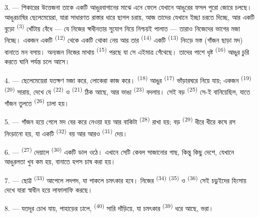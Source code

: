 3. --- শিকারের উত্তেজনা তাকে একটি আঙুরবাগানের মাঝে এনে ফেলে যেখানে আঙুরের ফসল
পুরো জোরে চলছে। আঙুরচাষির ছেলেমেয়েরা, যারা সাধারণত রাস্তার ধারে ছাগল চরায়,
আজ তাদের যেখানে ইচ্ছা চরতে দিচ্ছে, আর একটি বুড়ো 
\textsuperscript{(3)} খোঁটায় বেঁধে --- যে নিজের স্বাধীনতার সুযোগ নিয়ে নিশ্চয়ই
পালাত --- তারাও নিজেদের ভাগের মজা নিচ্ছে। একজন একটি 
\textsuperscript{(12)} থেকে একটি থোকা নেয় আর তার  \textsuperscript{(14)}
একটি  \textsuperscript{(13)} নিংড়ে মস্ত (গাঁজন ছাড়া মদ)
বানাতে মন বসায়। অন্যজন নিজের মাথায়  \textsuperscript{(15)}
পরছে যা সে এইমাত্র গেঁথেছে। তাদের পাশে ধৃষ্ট 
\textsuperscript{(16)} আঙুর চুরি করতে ঘানি পর্যন্ত চলে আসে।

4. --- ছেলেমেয়েরা যতক্ষণ মজা করে, লোকেরা কাজ করে। 
\textsuperscript{(18)} আঙুর  \textsuperscript{(17)}
ভাঁড়ারঘরে নিয়ে যায়; একজন  \textsuperscript{(19)}
 \textsuperscript{(20)} সারায়, দেখে যে 
\textsuperscript{(22)} ও  \textsuperscript{(21)} ঠিক আছে, আর ভাঙা
 \textsuperscript{(23)} বদলায়। সেই বড় 
\textsuperscript{(25)} সে-ই বানিয়েছিল, যাতে গাঁজন তুলতে 
\textsuperscript{(26)} ঢালা হয়।

5. --- গাঁজন হয়ে গেলে মদ বের করে নেওয়া হয় আর বাকিটা 
\textsuperscript{(28)} রাখা হয়; বড়  \textsuperscript{(29)} ধীরে
ধীরে কষে রস নিংড়ানো হয়, যা একটি  \textsuperscript{(32)} বয়
আর আরও  \textsuperscript{(31)} দেয়।

\VUsaut{6.0mm}
\VUsaut{3.4mm}

6. ---  \textsuperscript{(27)} দেয়ালে 
\textsuperscript{(30)} একটি ডাল ওঠে। এখানে সেটি কেবল সাজানোর গাছ, কিন্তু কিছু
দেশে, যেখানে আঙুরলতা খুব কম হয়,  বানাতে হপস চাষ করা হয়।

7. --- ছোট্ট  \textsuperscript{(33)} আপেলে লদপদ, যা পাকলে
চমৎকার  হবে। নিজের  \textsuperscript{(34)}
 \textsuperscript{(35)} ও 
\textsuperscript{(36)} সেই চড়ুইদের হিংসায় দেখে যারা স্বাধীন হয়ে লাফালাফি
করছে।

8. --- যতদূর চোখ যায়, পাহাড়ের ঢালে, 
\textsuperscript{(40)} সারি দাঁড়িয়ে, যা চমৎকার 
\textsuperscript{(39)} ধরে আছে,  ভরা।

